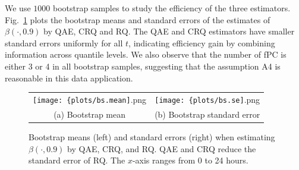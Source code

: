 \documentclass[times,sort&compress,3p]{elsarticle}
\theoremstyle{plain}%
\theoremstyle{definition}
\begin{document}
We use $1000$ bootstrap samples to study the efficiency of the three estimators. Fig.~\ref{fig:bs.data} plots the bootstrap means and standard errors of the estimates of $\beta(\cdot, 0.9)$ by QAE, CRQ and RQ. The QAE and CRQ estimators have smaller standard errors uniformly for all $t$, indicating efficiency gain by combining information across quantile levels. We also observe that the number of fPC is either 3 or 4 in all bootstrap samples, suggesting that the assumption A4 is reasonable in this data application. 



\begin{figure}
	\centering
	\begin{tabular}{cc}
	\texttt{[image: \{plots/bs.mean]}.png} & \texttt{[image: \{plots/bs.se]}.png} \\
	(a) Bootstrap mean & (b) Bootstrap standard error 
\end{tabular}
	\caption{Bootstrap means (left) and standard errors (right) when estimating $\beta(\cdot, 0.9)$ by QAE, CRQ, and RQ. QAE and CRQ reduce the standard error of RQ. The $x$-axis ranges from 0 to 24 hours.} 
	\label{fig:bs.data}
\end{figure}



\end{document}
